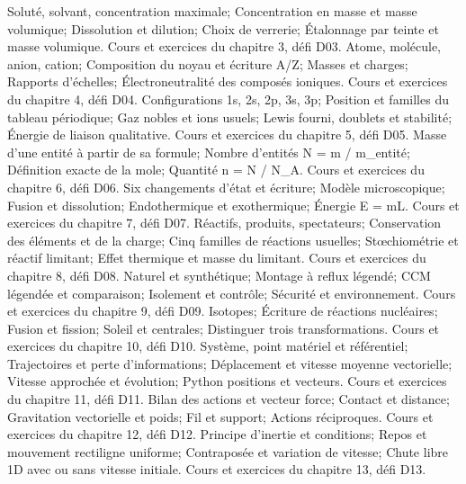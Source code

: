 Soluté, solvant, concentration maximale; Concentration en masse et masse volumique; Dissolution et dilution; Choix de verrerie; Étalonnage par teinte et masse volumique. Cours et exercices du chapitre 3, défi D03.
Atome, molécule, anion, cation; Composition du noyau et écriture A/Z; Masses et charges; Rapports d’échelles; Électroneutralité des composés ioniques. Cours et exercices du chapitre 4, défi D04.
Configurations 1s, 2s, 2p, 3s, 3p; Position et familles du tableau périodique; Gaz nobles et ions usuels; Lewis fourni, doublets et stabilité; Énergie de liaison qualitative. Cours et exercices du chapitre 5, défi D05.
Masse d’une entité à partir de sa formule; Nombre d’entités N = m / m\_entité; Définition exacte de la mole; Quantité n = N / N\_A. Cours et exercices du chapitre 6, défi D06.
Six changements d’état et écriture; Modèle microscopique; Fusion et dissolution; Endothermique et exothermique; Énergie E = mL. Cours et exercices du chapitre 7, défi D07.
Réactifs, produits, spectateurs; Conservation des éléments et de la charge; Cinq familles de réactions usuelles; Stœchiométrie et réactif limitant; Effet thermique et masse du limitant. Cours et exercices du chapitre 8, défi D08.
Naturel et synthétique; Montage à reflux légendé; CCM légendée et comparaison; Isolement et contrôle; Sécurité et environnement. Cours et exercices du chapitre 9, défi D09.
Isotopes; Écriture de réactions nucléaires; Fusion et fission; Soleil et centrales; Distinguer trois transformations. Cours et exercices du chapitre 10, défi D10.
Système, point matériel et référentiel; Trajectoires et perte d’informations; Déplacement et vitesse moyenne vectorielle; Vitesse approchée et évolution; Python positions et vecteurs. Cours et exercices du chapitre 11, défi D11.
Bilan des actions et vecteur force; Contact et distance; Gravitation vectorielle et poids; Fil et support; Actions réciproques. Cours et exercices du chapitre 12, défi D12.
Principe d’inertie et conditions; Repos et mouvement rectiligne uniforme; Contraposée et variation de vitesse; Chute libre 1D avec ou sans vitesse initiale. Cours et exercices du chapitre 13, défi D13.

